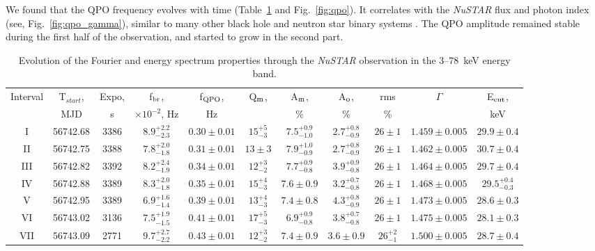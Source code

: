 \documentclass[a4paper,fleqn,usenatbib]{mnras}
\begin{document}
We found that the QPO frequency evolves with time (Table~\ref{tab:timing} and Fig.~\ref{fig:qpo}).
It correlates with the {\it NuSTAR} flux and photon index (see, Fig.~\ref{fig:qpo_gamma}), similar to many other black hole and neutron star binary systems \citep[see, e.g.,][]{vignarca03,2003A&A...407.1039P, 2000ApJ...531..537S, 2016ApJ...828...34F}.
The QPO amplitude remained stable during the first half of the observation, and started to grow in the second part.

\begin{table}
\noindent
\centering
\caption{Evolution of the Fourier and energy spectrum properties through the {\it NuSTAR} observation in the 3--78~keV energy band.}
\label{tab:timing}
\centering
\begin{tabular}{|c|c|c|c|c|c|c|c|c|c|c|}
\hline\hline
Interval    & T$_{start}$,  & Expo,     & f$_{\rm br}$,                     & f$_{\rm QPO}$, & Q$_{\rm m}$,     & A$_{\rm m}$,  & A$_{\rm o}$,      & rms & $\Gamma$ & E$_{\rm cut}$, \\
            &  MJD          &  s        & $\times10^{-2}$, Hz               &  Hz            &   & \%            &  \%               &   \%       &          &  keV             \\
\hline
I           & 56742.68      & 3386      & $8.9_{-2.3}^{+2.2}$  & $0.30\pm0.01$ & $15_{-3}^{+5}$ & $7.5_{-1.0}^{+0.9}$ & $2.7_{-0.9}^{+0.8}$ & $26\pm1$ & $1.459\pm0.005$ & $29.9\pm0.4$ \\
II & 56742.75 & 3388 & $7.8_{-1.8}^{+2.0}$ & $0.31\pm0.01$ & $13\pm3$ & $7.9_{-0.9}^{+1.0}$ & $2.7_{-0.9}^{+0.8}$ & $26\pm1$ & $1.462\pm0.005$ & $30.7\pm0.4$ \\
III & 56742.82 & 3392 & $8.2_{-1.9}^{+2.4}$ & $0.34\pm0.01$ & $12_{-2}^{+3}$ & $7.7_{-0.8}^{+0.9}$ & $3.9_{-0.8}^{+0.9}$ & $26\pm1$ & $1.464\pm0.005$ & $29.7\pm0.4$ \\
IV & 56742.88 & 3389 & $8.3_{-1.8}^{+2.0}$ & $0.35\pm0.01$ & $15_{-3}^{+4}$ & $7.6\pm0.9$ & $3.2_{-0.8}^{+0.7}$ & $26\pm1$ & $1.468\pm0.005$ & $29.5_{-0.3}^{+0.4}$ \\
V & 56742.95 & 3389 & $6.9_{-1.4}^{+1.6}$ & $0.39\pm0.01$ & $13_{-3}^{+4}$ & $7.4\pm0.8$ & $4.3_{-0.9}^{+0.8}$ & $26\pm1$ & $1.473\pm0.005$ & $28.6\pm0.3$ \\
VI & 56743.02 & 3136 & $7.5_{-1.5}^{+1.9}$ & $0.41\pm0.01$ & $17_{-3}^{+5}$ & $6.9_{-0.8}^{+0.9}$ & $3.8_{-0.8}^{+0.7}$ & $26\pm1$ & $1.475\pm0.005$ & $28.1\pm0.3$ \\
VII & 56743.09 & 2771 & $9.7_{-2.2}^{+2.7}$ & $0.43\pm0.01$ & $12_{-2}^{+3}$ & $7.4\pm0.9$ & $3.6\pm0.9$ & $26_{-1}^{+2}$ & $1.500\pm0.005$ & $28.7\pm0.4$ \\

\end{tabular}
\end{table}
\end{document}
